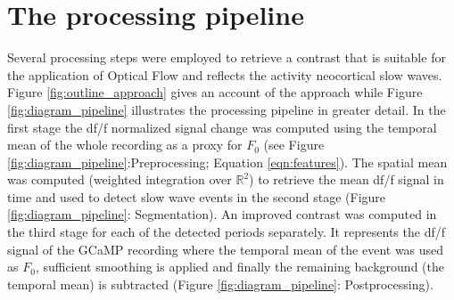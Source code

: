 \section{The processing pipeline}
\label{processing_pipeline}
Several processing steps were employed to retrieve a contrast that is suitable for the application of Optical Flow and reflects the activity neocortical slow waves. Figure \ref{fig:outline_approach} gives an account of the approach while Figure \ref{fig:diagram_pipeline} illustrates the processing pipeline in greater detail. In the first stage the df/f normalized signal change was computed using the temporal mean of the whole recording as a proxy for $F_0$ (see Figure \ref{fig:diagram_pipeline}:Preprocessing; Equation \ref{eqn:features}). The spatial mean was computed (weighted integration over $\mathbb{R}^2$) to retrieve the mean df/f signal in time and used to detect slow wave events in the second stage (Figure \ref{fig:diagram_pipeline}: Segmentation). An improved contrast was computed in the third stage for each of the detected periods separately. It represents the df/f signal of the GCaMP recording where the temporal mean of the event was used as $F_0$, sufficient smoothing is applied and finally the remaining background (the temporal mean) is subtracted (Figure \ref{fig:diagram_pipeline}: Postprocessing).\\
